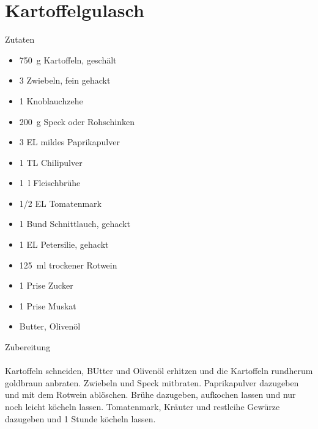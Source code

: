 \section*{Kartoffelgulasch}
\ihead{}\ohead{}
\cfoot{}
{\Large Zutaten}
\begin{multicols}{2}
\begin{itemize}
    \item \SI{750}{g} Kartoffeln, geschält
    \item \num{3} Zwiebeln, fein gehackt
    \item \num{1} Knoblauchzehe
    \item \SI{200}{g} Speck oder Rohschinken
    \item \num{3} EL mildes Paprikapulver
    \item \num{1} TL Chilipulver
    \item \SI{1}{l} Fleischbrühe
    \item \num{1/2} EL Tomatenmark
    \item \num{1} Bund Schnittlauch, gehackt
    \item \num{1} EL Petersilie, gehackt
    \item \SI{125}{ml} trockener Rotwein
    \item \num{1} Prise Zucker
    \item \num{1} Prise Muskat
    \item Butter, Olivenöl
\end{itemize}
\end{multicols}
\noindent
{\Large Zubereitung}\\
\\
Kartoffeln schneiden, BUtter und Olivenöl erhitzen und die Kartoffeln rundherum goldbraun anbraten.
Zwiebeln und Speck mitbraten.
Paprikapulver dazugeben und mit dem Rotwein ablöschen.
Brühe dazugeben, aufkochen lassen und nur noch leicht köcheln lassen.
Tomatenmark, Kräuter und restlcihe Gewürze dazugeben und \num{1} Stunde köcheln lassen.